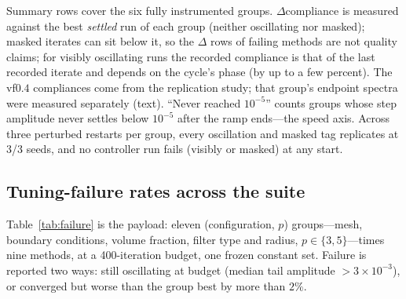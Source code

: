 \documentclass[11pt,a4paper]{article}
\begin{document}
\begin{table}[t]
\smallskip
{\footnotesize Summary rows cover the six fully instrumented groups.
$\Delta$compliance is measured against the best \emph{settled} run of
each group (neither oscillating nor masked); masked iterates can sit
below it, so the $\Delta$ rows of failing methods are not quality
claims; for visibly oscillating runs the recorded compliance is that of
the last recorded iterate and depends on the cycle's phase (by up to a
few percent). The vf$0.4$ compliances come from the replication study; that
group's endpoint spectra were measured separately (text).
``Never reached $10^{-5}$'' counts groups whose step amplitude never
settles below $10^{-5}$ after the ramp ends---the speed axis. Across
three perturbed restarts per group, every oscillation and masked tag
replicates at 3/3 seeds, and no controller run fails (visibly or
masked) at any start.}
\end{table}

\subsection{Tuning-failure rates across the suite}\label{sec:sweeprates}

Table~\ref{tab:failure} is the payload: eleven (configuration, $p$)
groups---mesh, boundary conditions, volume fraction, filter type and
radius, $p\in\{3,5\}$---times nine methods, at a 400-iteration budget,
one frozen constant set. Failure is reported two ways: still oscillating
at budget (median tail amplitude $>3\times10^{-3}$), or converged but
worse than the group best by more than $2\%$.
\end{document}
